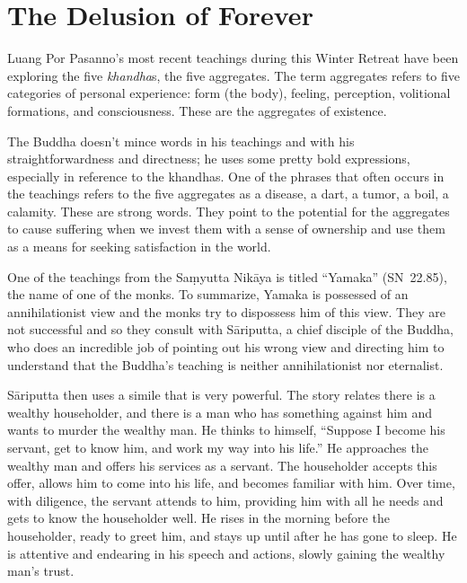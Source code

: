 
\chapter{The Delusion of Forever}

Luang Por Pasanno's most recent teachings during this Winter Retreat have been exploring the five \emph{khandha}s, the five aggregates. The term aggregates refers to five categories of personal experience: form (the body), feeling, perception, volitional formations, and consciousness. These are the aggregates of existence.

The Buddha doesn't mince words in his teachings and with his straightforwardness and directness; he uses some pretty bold expressions, especially in reference to the khandhas. One of the phrases that often occurs in the teachings refers to the five aggregates as a disease, a dart, a tumor, a boil, a calamity. These are strong words. They point to the potential for the aggregates to cause suffering when we invest them with a sense of ownership and use them as a means for seeking satisfaction in the world.

One of the teachings from the Saṃyutta Nikāya is titled ``Yamaka'' \mbox{(SN 22.85)}, the name of one of the monks. To summarize, Yamaka is possessed of an annihilationist view and the monks try to dispossess him of this view. They are not successful and so they consult with Sāriputta, a chief disciple of the Buddha, who does an incredible job of pointing out his wrong view and directing him to understand that the Buddha's teaching is neither annihilationist nor eternalist.

Sāriputta then uses a simile that is very powerful. The story relates there is a wealthy householder, and there is a man who has something against him and wants to murder the wealthy man. He thinks to himself, ``Suppose I become his servant, get to know him, and work my way into his life.'' He approaches the wealthy man and offers his services as a servant. The householder accepts this offer, allows him to come into his life, and becomes familiar with him. Over time, with diligence, the servant attends to him, providing him with all he needs and gets to know the householder well. He rises in the morning before the householder, ready to greet him, and stays up until after he has gone to sleep. He is attentive and endearing in his speech and actions, slowly gaining the wealthy man's trust.

